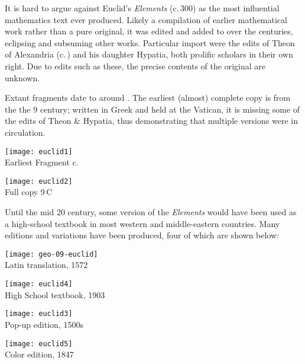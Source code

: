 It is hard to argue against Euclid's \emph{Elements} (c.\,300\BC{}) as the most influential mathematics text ever produced. Likely a compilation of earlier mathematical work rather than a pure original, it was edited and added to over the centuries, eclipsing and subsuming other works. Particular import were the edits of Theon of Alexandria (c.\,) and his daughter Hypatia, both prolific scholars in their own right. Due to edits such as these, the precise contents of the original are unknown.\smallbreak

Extant fragments date to around . The earliest (almost) complete copy is from the the 9\th{} century; written in Greek and held at the Vatican, it is missing some of the edits of Theon \& Hypatia, thus demonstrating that multiple versions were in circulation.

\begin{center}
\begin{minipage}[b]{0.45\linewidth}
\centering\texttt{[image: euclid1]}\\
Earliest Fragment c.\,
\end{minipage}
\begin{minipage}[b]{0.45\linewidth}
\centering\texttt{[image: euclid2]}\\
Full copy 9\th\,C
\end{minipage}
\end{center}

\goodbreak

Until the mid 20\th{} century, some version of the \emph{Elements} would have been used as a high-school textbook in most western and middle-eastern countries. Many editions and variations have been produced, four of which are shown below:
\begin{center}
\begin{minipage}[b]{0.683\linewidth}
\centering\texttt{[image: geo-09-euclid]}\\
Latin translation, 1572
\end{minipage}\begin{minipage}[b]{0.317\linewidth}
\centering\texttt{[image: euclid4]}\\
High School textbook, 1903
\end{minipage}\smallbreak
\begin{minipage}[b]{0.67\linewidth}
\centering\texttt{[image: euclid3]}\\
Pop-up edition, 1500s
\end{minipage}\begin{minipage}[b]{0.33\linewidth}
\centering\texttt{[image: euclid5]}\\
Color edition, 1847
\end{minipage}
\end{center}

